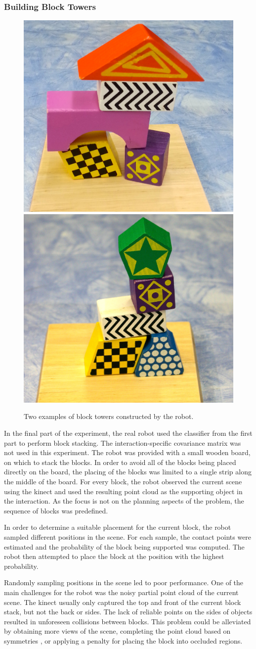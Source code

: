 \subsubsection*{Building Block Towers}

\begin{figure}
\begin{centering}
\includegraphics[width=0.245\columnwidth]{oli/PicsforIROS2014/Pile1}\includegraphics[width=0.2482\columnwidth]{oli/PicsforIROS2014/Pile2}
\par\end{centering}

\caption{\label{fig:blocktowers}Two examples of block towers constructed by
the robot.}
\end{figure}
In the final part of the experiment, the real robot used the classifier
from the first part to perform block stacking. The interaction-specific
covariance matrix was not used in this experiment. The robot was provided
with a small wooden board, on which to stack the blocks. In order
to avoid all of the blocks being placed directly on the board, the
placing of the blocks was limited to a single strip along the middle
of the board. For every block, the robot observed the current scene
using the kinect and used the resulting point cloud as the supporting
object in the interaction. As the focus is not on the planning aspects
of the problem, the sequence of blocks was predefined. 

In order to determine a suitable placement for the current block, the robot sampled different
positions in the scene. For each sample, the contact points were estimated
and the probability of the block being supported was computed. The
robot then attempted to place the block at the position with the highest
probability. 

Randomly sampling positions in the scene led to poor performance.
One of the main challenges for the robot was the noisy partial point cloud
of the current scene. The kinect usually only captured the top and
front of the current block stack, but not the back or sides. The lack
of reliable points on the sides of objects resulted in unforeseen
collisions between blocks. This problem could be alleviated by obtaining
more views of the scene, completing the point cloud based on symmetries
\cite{BohgMindtheGap,Kroemer_Humanoids_2012}, or applying a penalty for
placing the block into occluded regions. 


